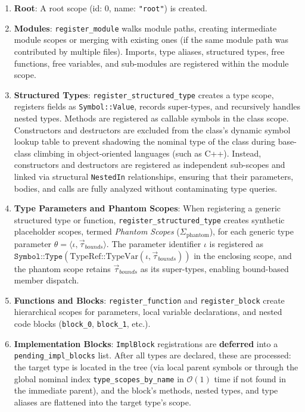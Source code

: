 \begin{enumerate}
  \item \textbf{Root}: A root scope (id: 0, name: \texttt{"root"}) is created.
  \item \textbf{Modules}: \texttt{register\_module} walks module
    paths, creating intermediate module scopes or merging with
    existing ones (if the same module path was contributed by
    multiple files). Imports, type aliases, structured types, free
    functions, free variables, and sub-modules are registered within
    the module scope.
  \item \textbf{Structured Types}:
    \texttt{register\_structured\_type} creates a type scope,
    registers fields as \texttt{Symbol::Value}, records super-types, and
    recursively handles nested types. Methods are registered as callable
    symbols in the class scope. Constructors and destructors
    are excluded from the class's dynamic symbol lookup table to prevent
    shadowing the nominal type of the class during base-class climbing
    in object-oriented languages (such as C++). Instead, constructors
    and destructors are registered as independent sub-scopes and linked
    via structural \texttt{NestedIn} relationships, ensuring that their
    parameters, bodies, and calls are fully analyzed without contaminating
    type queries.
  \item \textbf{Type Parameters and Phantom Scopes}:
    When registering a generic structured type or function,
    \texttt{register\_structured\_type} creates syn\-thet\-ic
    placeholder scopes,
    termed \textit{Phantom Scopes} ($\Sigma_{\text{phantom}}$), for
    each generic type
    parameter $\theta = \langle \iota, \vec{\tau}_{bounds} \rangle$.
    The parameter
    identifier $\iota$ is registered as
    $\texttt{Symbol::Type}(\text{TypeRef::TypeVar}(\iota, \vec{\tau}_{bounds}))$
    in the enclosing scope, and the phantom scope retains $\vec{\tau}_{bounds}$
    as its super-types, enabling bound-based member dispatch.
  \item \textbf{Functions and Blocks}: \texttt{register\_function}
    and \texttt{register\_block} create hierarchical scopes for
    parameters, local variable declarations, and nested code blocks
    (\texttt{block\_0}, \texttt{block\_1}, etc.).
  \item \textbf{Implementation Blocks}: \texttt{ImplBlock}
    registrations are \textbf{deferred} into a
    \texttt{pending\_impl\_blocks} list. After all types are
    declared, these are processed: the target type is located in the
    tree (via local parent symbols or through the global nominal index
      \texttt{type\_scopes\_by\_name} in $\mathcal{O}(1)$ time if not
    found in the immediate parent), and the block's methods, nested
    types, and type aliases are flattened into the target type's scope.
\end{enumerate}

